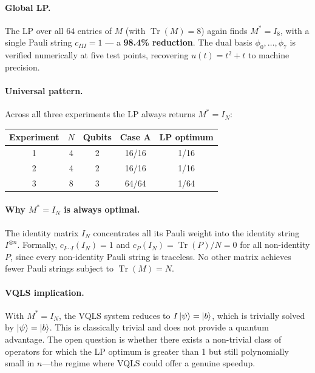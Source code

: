 \documentclass[a4paper,12pt]{amsart}
\begin{document}
\paragraph{Global LP.}
The LP over all $64$ entries of $M$ (with $\operatorname{Tr}(M)=8$) again finds $M^* = I_8$, with a single Pauli string $c_{III}=1$ --- a \textbf{98.4\% reduction}. The dual basis $\phi_0,\ldots,\phi_7$ is verified numerically at five test points, recovering $u(t)=t^2+t$ to machine precision.

\paragraph{Universal pattern.}
Across all three experiments the LP always returns $M^*=I_N$:

\begin{center}
\begin{tabular}{ccccc}
\hline
Experiment & $N$ & Qubits & Case A & LP optimum \\
\hline
1 & 4 & 2 & 16/16 & 1/16 \\
2 & 4 & 2 & 16/16 & 1/16 \\
3 & 8 & 3 & 64/64 & 1/64 \\
\hline
\end{tabular}
\end{center}

\paragraph{Why $M^*=I_N$ is always optimal.}
The identity matrix $I_N$ concentrates all its Pauli weight into the identity string $I^{\otimes n}$. Formally, $c_{I\cdots I}(I_N)=1$ and $c_P(I_N)=\operatorname{Tr}(P)/N=0$ for all non-identity $P$, since every non-identity Pauli string is traceless. No other matrix achieves fewer Pauli strings subject to $\operatorname{Tr}(M)=N$.

\paragraph{VQLS implication.}
With $M^*=I_N$, the VQLS system reduces to $I\ket{\psi}=\ket{b}$, which is trivially solved by $\ket{\psi}=\ket{b}$. This is classically trivial and does not provide a quantum advantage. The open question is whether there exists a non-trivial class of operators for which the LP optimum is greater than 1 but still polynomially small in $n$---the regime where VQLS could offer a genuine speedup.
\end{document}
